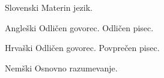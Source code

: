 

\begin{cvskills}


\cvskill
{Slovenski} %
{Materin jezik.} %


\cvskill
{Angleški} %
{Odličen govorec. Odličen pisec.} %


\cvskill
{Hrvaški} %
{Odličen govorec. Povprečen pisec.} %


\cvskill
{Nemški} %
{Osnovno razumevanje.} %

\end{cvskills}



